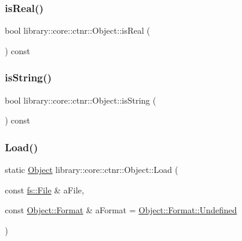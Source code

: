 \mbox{\label{classlibrary_1_1core_1_1ctnr_1_1_object_ab638356093a8b746f178fde641632d91}} 
\subsubsection{\texorpdfstring{is\+Real()}{isReal()}}
{\footnotesize\ttfamily bool library\+::core\+::ctnr\+::\+Object\+::is\+Real (\begin{DoxyParamCaption}{ }\end{DoxyParamCaption}) const}

\mbox{\label{classlibrary_1_1core_1_1ctnr_1_1_object_ae7248bcf0097fbd940dfa6a93097cd60}} 
\subsubsection{\texorpdfstring{is\+String()}{isString()}}
{\footnotesize\ttfamily bool library\+::core\+::ctnr\+::\+Object\+::is\+String (\begin{DoxyParamCaption}{ }\end{DoxyParamCaption}) const}

\mbox{\label{classlibrary_1_1core_1_1ctnr_1_1_object_a508e658f6525f7607a7fa869c3ac4df5}} 
\subsubsection{\texorpdfstring{Load()}{Load()}}
{\footnotesize\ttfamily static \hyperlink{classlibrary_1_1core_1_1ctnr_1_1_object}{Object} library\+::core\+::ctnr\+::\+Object\+::\+Load (\begin{DoxyParamCaption}\item[{const \hyperlink{classlibrary_1_1core_1_1fs_1_1_file}{fs\+::\+File} \&}]{a\+File,  }\item[{const \hyperlink{classlibrary_1_1core_1_1ctnr_1_1_object_a7bf8961c4ef65f691aa2993ec405c647}{Object\+::\+Format} \&}]{a\+Format = {\ttfamily \hyperlink{classlibrary_1_1core_1_1ctnr_1_1_object_a7bf8961c4ef65f691aa2993ec405c647aec0fc0100c4fc1ce4eea230c3dc10360}{Object\+::\+Format\+::\+Undefined}} }\end{DoxyParamCaption})\hspace{0.3cm}{\ttfamily [static]}}

